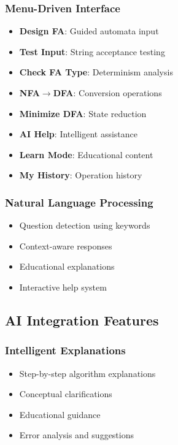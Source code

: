\documentclass[12pt]{article}
\begin{document}
\subsubsection{Menu-Driven Interface}
\begin{itemize}
    \item \textbf{Design FA}: Guided automata input
    \item \textbf{Test Input}: String acceptance testing
    \item \textbf{Check FA Type}: Determinism analysis
    \item \textbf{NFA$\to$DFA}: Conversion operations
    \item \textbf{Minimize DFA}: State reduction
    \item \textbf{AI Help}: Intelligent assistance
    \item \textbf{Learn Mode}: Educational content
    \item \textbf{My History}: Operation history
\end{itemize}

\subsubsection{Natural Language Processing}
\begin{itemize}
    \item Question detection using keywords
    \item Context-aware responses
    \item Educational explanations
    \item Interactive help system
\end{itemize}

\subsection{AI Integration Features}

\subsubsection{Intelligent Explanations}
\begin{itemize}
    \item Step-by-step algorithm explanations
    \item Conceptual clarifications
    \item Educational guidance
    \item Error analysis and suggestions
\end{itemize}
\end{document}
